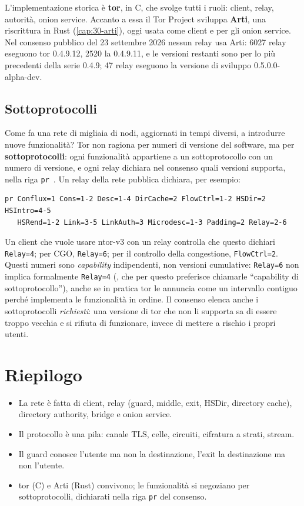 L'implementazione storica è \textbf{tor}, in C, che svolge tutti i ruoli: client, relay, autorità, onion service. Accanto a essa il Tor Project sviluppa \textbf{Arti}, una riscrittura in Rust (\cref{cap:30-arti}), oggi usata come client e per gli onion service. Nel consenso pubblico del 23 settembre 2026 nessun relay usa Arti: 6027 relay eseguono tor 0.4.9.12, 2520 la 0.4.9.11, e le versioni restanti sono per lo più precedenti della serie 0.4.9; 47 relay eseguono la versione di sviluppo 0.5.0.0-alpha-dev.

\subsection{Sottoprotocolli}

Come fa una rete di migliaia di nodi, aggiornati in tempi diversi, a introdurre nuove funzionalità? Tor non ragiona per numeri di versione del software, ma per \textbf{sottoprotocolli}: ogni funzionalità appartiene a un sottoprotocollo con un numero di versione, e ogni relay dichiara nel consenso quali versioni supporta, nella riga \texttt{pr}~. Un relay della rete pubblica dichiara, per esempio:
\begin{lstlisting}[numbers=none]
pr Conflux=1 Cons=1-2 Desc=1-4 DirCache=2 FlowCtrl=1-2 HSDir=2 HSIntro=4-5
   HSRend=1-2 Link=3-5 LinkAuth=3 Microdesc=1-3 Padding=2 Relay=2-6
\end{lstlisting}
Un client che vuole usare ntor-v3 con un relay controlla che questo dichiari \texttt{Relay=4}; per CGO, \texttt{Relay=6}; per il controllo della congestione, \texttt{FlowCtrl=2}. Questi numeri sono \emph{capability} indipendenti, non versioni cumulative: \texttt{Relay=6} non implica formalmente \texttt{Relay=4} (, che per questo preferisce chiamarle \enquote{capability di sottoprotocollo}), anche se in pratica tor le annuncia come un intervallo contiguo perché implementa le funzionalità in ordine. Il consenso elenca anche i sottoprotocolli \emph{richiesti}: una versione di tor che non li supporta sa di essere troppo vecchia e si rifiuta di funzionare, invece di mettere a rischio i propri utenti.

\section*{Riepilogo}
\begin{itemize}
  \item La rete è fatta di client, relay (guard, middle, exit, HSDir, directory cache), directory authority, bridge e onion service.
  \item Il protocollo è una pila: canale TLS, celle, circuiti, cifratura a strati, stream.
  \item Il guard conosce l'utente ma non la destinazione, l'exit la destinazione ma non l'utente.
  \item tor (C) e Arti (Rust) convivono; le funzionalità si negoziano per sottoprotocolli, dichiarati nella riga \texttt{pr} del consenso.
\end{itemize}

